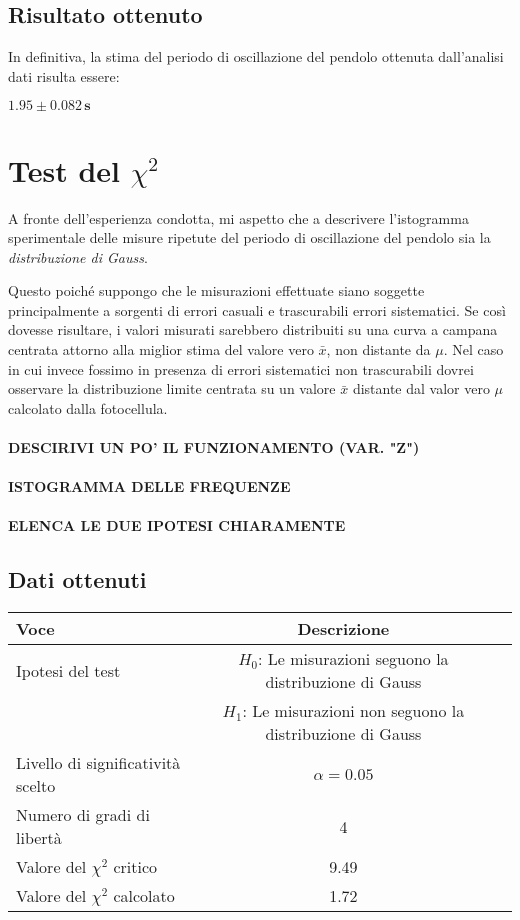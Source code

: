 \documentclass{article}
\begin{document}
\subsection{Risultato ottenuto}
In definitiva, la stima del periodo di oscillazione del pendolo ottenuta dall'analisi dati risulta essere: 
\begin{center}
$\mathbf{1.95 \pm 0.082 \, \text{s}}$
\end{center}

\section{Test del $\chi^2$}
A fronte dell'esperienza condotta, mi aspetto che a descrivere l'istogramma sperimentale delle misure ripetute del periodo di oscillazione del pendolo sia la \textit{distribuzione di Gauss}.

Questo poiché suppongo che le misurazioni effettuate siano soggette principalmente a sorgenti di errori casuali e trascurabili errori sistematici. Se così dovesse risultare, i valori misurati sarebbero distribuiti su una curva a campana centrata attorno alla miglior stima del valore vero $\bar{x}$, non distante da $\mu$. 
Nel caso in cui invece fossimo in presenza di errori sistematici non trascurabili dovrei osservare la distribuzione limite centrata su un valore $\bar{x}$ distante dal valor vero $\mu$ calcolato dalla fotocellula.
\\\\
\textbf{DESCIRIVI UN PO' IL FUNZIONAMENTO (VAR. "Z")}
\\\\
\textbf{ISTOGRAMMA DELLE FREQUENZE}
\\\\
\textbf{ELENCA LE DUE IPOTESI CHIARAMENTE}

\subsection{Dati ottenuti}
\begin{table}[ht]
\centering
{}
\begin{tabular}{|l|c|p{10cm}|}
\hline
\textbf{Voce} & \textbf{Descrizione} \\
\hline
Ipotesi del test & \textbf{\(H_0\)}: Le misurazioni seguono la distribuzione di Gauss \\
                & \textbf{\(H_1\)}: Le misurazioni non seguono la distribuzione di Gauss \\
\hline
Livello di significatività scelto & $\alpha = 0.05$ \\
\hline
Numero di gradi di libertà & 4 \\
\hline
Valore del $\chi^2$ critico & 9.49 \\
\hline
Valore del $\chi^2$ calcolato & 1.72 \\
\hline
\end{tabular}
\label{tab:chi_quadro_test}
\end{table}
\end{document}
